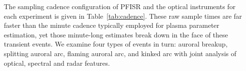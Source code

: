 The sampling cadence configuration of PFISR and the optical instruments for each experiment is given in Table~\ref{tab:cadence}.
These raw sample times are far faster than the minute cadence typically employed for plasma parameter estimation, yet those minute-long estimates break down in the face of these transient events.
We examine four types of events in turn: auroral breakup, splitting auroral arc, flaming auroral arc, and kinked arc with joint analysis of optical, spectral and radar features.








